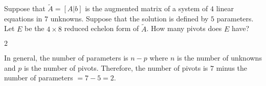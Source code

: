\documentclass{ximera}
\begin{document}
     \begin{exercise} \label{c2.3.7aa}
       Suppose that $\tilde{A} = [A|b]$ is the augmented matrix of a system of $4$ linear equations in $7$ unknowns. Suppose that the solution is defined by $5$ parameters. Let $E$ be the $4\times 8$ reduced echelon form of $\tilde{A}$. How many pivots does $E$ have?
\begin{solution}

\ans $2$ 

\soln       In general, the number of parameters is $n-p$ where $n$ is the number of unknowns and $p$ is the number of pivots.  Therefore, the number of pivots is $7$ minus the number of parameters $=7-5 = 2$.
\end{solution}
     \end{exercise}
\end{document}
